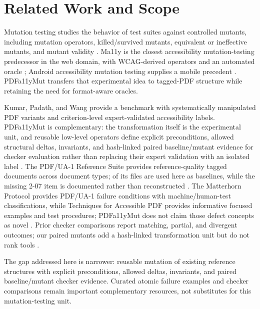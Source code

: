 \documentclass[conference]{IEEEtran}
\newcommand{\taggedsection}[1]{%
  \tagstructbegin{tag=H1}\tagmcbegin{tag=H1}\section{#1}\tagmcend\tagstructend}
\newenvironment{taggedparagraph}{%
  \tagstructbegin{tag=P}\tagmcbegin{tag=P}%
}{%
  \tagmcend\tagstructend%
}
\begin{document}
\taggedsection{Related Work and Scope}
\begin{taggedparagraph}
Mutation testing studies the behavior of test suites against controlled mutants, including mutation operators, killed/survived mutants, equivalent or ineffective mutants, and mutant validity \cite{mutation}. Ma11y is the closest accessibility mutation-testing predecessor in the web domain, with WCAG-derived operators and an automated oracle \cite{ma11y}; Android accessibility mutation testing supplies a mobile precedent \cite{androidmut}. PDFa11yMut transfers that experimental idea to tagged-PDF structure while retaining the need for format-aware oracles.
\end{taggedparagraph}

\begin{taggedparagraph}
Kumar, Padath, and Wang provide a benchmark with systematically manipulated PDF variants and criterion-level expert-validated accessibility labels. PDFa11yMut is complementary: the transformation itself is the experimental unit, and reusable low-level operators define explicit preconditions, allowed structural deltas, invariants, and hash-linked paired baseline/mutant evidence for checker evaluation rather than replacing their expert validation with an isolated label \cite{kumar}. The PDF/UA-1 Reference Suite provides reference-quality tagged documents across document types; \ReferencePDFs{} of its files are used here as baselines, while the missing 2-07 item is documented rather than reconstructed \cite{refsuite}. The Matterhorn Protocol provides PDF/UA-1 failure conditions with machine/human-test classifications, while Techniques for Accessible PDF provides informative focused examples and test procedures; PDFa11yMut does not claim those defect concepts as novel \cite{matterhorn,techniques}. Prior checker comparisons report matching, partial, and divergent outcomes; our paired mutants add a hash-linked transformation unit but do not rank tools \cite{crossvalidator}.
\end{taggedparagraph}

\begin{taggedparagraph}
The gap addressed here is narrower: reusable mutation of existing reference structures with explicit preconditions, allowed deltas, invariants, and paired baseline/mutant checker evidence. Curated atomic failure examples and checker comparisons remain important complementary resources, not substitutes for this mutation-testing unit.
\end{taggedparagraph}
\end{document}
